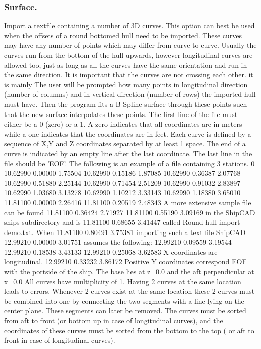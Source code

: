 \documentclass[12pt]{article}
\begin{document}
\subsubsection{Surface.}
Import a textfile containing a number of 3D curves. This
option can best be used when the offsets of a round
bottomed hull need to be imported. These curves may
have any number of points which may differ from curve to
curve. Usually the curves run from the bottom of the hull
upwards, however longitudinal curves are allowed too,
just as long as all the curves have the same orientation
and run in the same direction. It is important that the
curves are not crossing each other.
it is mainly
The user will be prompted how many points in
longitudinal direction (number of columns) and in
vertical direction (number of rows) the imported
hull must have. Then the program fits a B-Spline
surface through these points such that the new
surface interpolates these points.
The first line of the file must either be a 0 (zero) or a 1. A zero indicates that all coordinates are in
meters while a one indicates that the coordinates are in feet. Each curve is defined by a sequence
of X,Y and Z coordinates separated by at least 1 space. The end of a curve is indicated by an
empty line after the last coordinate. The last line in the file should be 'EOF'. The following is an
example of a file containing 3 stations.
0
10.62990
 0.00000
 1.75504
10.62990
 0.15186
 1.87085
10.62990
 0.36387
 2.07768
10.62990
 0.51880
 2.25144
10.62990
 0.71454
 2.51209
10.62990
 0.91032
 2.83897
10.62990
 1.03680
 3.13278
10.62990
 1.10212
 3.33143
10.62990
 1.18380
 3.65010
11.81100
 0.00000
 2.26416
11.81100
 0.20519
 2.48343
A more extensive sample file can be found
 11.81100
 0.36424
 2.71927
11.81100
 0.55190
 3.09169
in the ShipCAD ships subdirectory and is
 11.81100
 0.68655
 3.41447
called Round hull import demo.txt. When
 11.81100
 0.80491
 3.75381
importing such a text file ShipCAD
 12.99210
 0.00000
 3.01751
assumes the following:
 12.99210
 0.09559
 3.19544
12.99210
 0.18538
 3.43133
12.99210
 0.25068
 3.62583
X-coordinates are longitudinal.
 12.99210
 0.33232
 3.86172
Positive Y coordinates correspond
 EOF
with the portside of the ship. The base lies at z=0.0 and the aft perpendicular at x=0.0
All curves have multiplicity of 1. Having 2 curves at the same location leads to errors.
Whenever 2 curves exist at the same location these 2 curves must be combined into one by
connecting the two segments with a line lying on the center plane. These segments can later
be removed.
The curves must be sorted from aft to front (or bottom up in case of longitudinal curves), and
the coordinates of these curves must be sorted from the bottom to the top ( or aft to front in
case of longitudinal curves).
\end{document}
